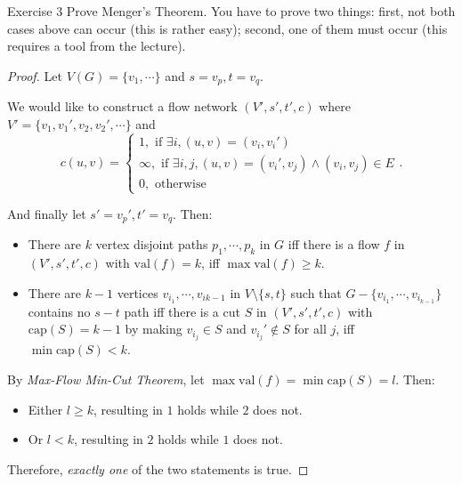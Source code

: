     \begin{thm}{Exercise 3}{}
        Prove Menger’s Theorem. You have to prove two things: first, not both cases above can occur (this is rather easy); second, one of them must occur (this requires a tool from the lecture).
    \end{thm}
    \begin{proof}[Proof]
        Let $V(G) = \{v_1, \cdots \}$ and $s = v_p, t = v_q$. 
    
        We would like to construct a flow network $(V', s', t', c)$ where $V' = \{v_1, v_1', v_2, v_2', \cdots \}$ and
        $$c(u, v) = \begin{cases}
            1, \text{ if } \exists i, (u, v) = (v_i, v_i') \\
            \infty, \text{ if } \exists i, j, (u, v) = (v_i', v_j) \wedge (v_i, v_j) \in E \\
            0, \text{ otherwise }
        \end{cases}.$$
    
        And finally let $s' = v_p', t' = v_q$. Then:
    
        \begin{itemize}
            \item There are $k$ vertex disjoint paths $p_1, \cdots ,p_k$ in $G$ iff there is a flow $f$ in $(V', s', t', c)$ with $\text{val}(f) = k$, iff $\max \text{val}(f) \ge k$.
            \item There are $k-1$ vertices $v_{i_1}, \cdots ,v_{i{k-1}}$ in $V \setminus \{s, t\} $ such that $G - \{v_{i_1},\cdots , v_{i_{k-1}}\} $ contains no $s-t$ path iff there is a cut $S$ in $(V', s', t', c)$ with $\text{cap}(S) = k-1$ by making $v_{i_j} \in S$ and $v_{i_j}' \not\in S$ for all $j$, iff $\min \text{cap}(S) < k$.
        \end{itemize}
    
        By \textit{Max-Flow Min-Cut Theorem}, let $\max \text{val}(f) = \min \text{cap}(S) = l$. Then:
        \begin{itemize}
            \item Either $l \ge k$, resulting in $1$ holds while $2$ does not.
            \item Or $l < k$, resulting in $2$ holds while $1$ does not.
        \end{itemize}
    
        Therefore, \textit{exactly one} of the two statements is true.
    \end{proof}

